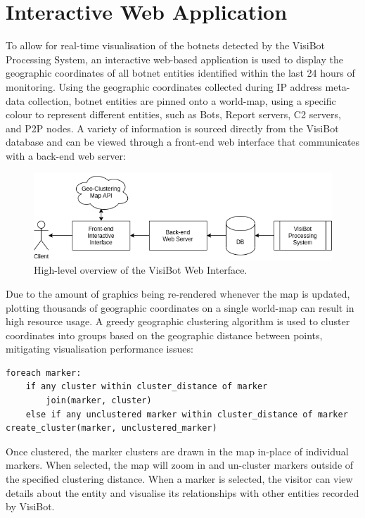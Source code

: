 \section{Interactive Web Application}

To allow for real-time visualisation of the botnets detected by the VisiBot Processing System, an interactive web-based application is used to display the geographic coordinates of all botnet entities identified within the last 24 hours of monitoring. Using the geographic coordinates collected during IP address meta-data collection, botnet entities are pinned onto a world-map, using a specific colour to represent different entities, such as Bots, Report servers, C2 servers, and P2P nodes. A variety of information is sourced directly from the VisiBot database and can be viewed through a front-end web interface that communicates with a back-end web server:

\begin{figure}[!htb]
    \centering
    \includegraphics[width=0.6\linewidth]{flowcharts/design_overview_webapp.png}
    \caption{High-level overview of the VisiBot Web Interface.}
    \label{fig:webapp_design_overview} 
\end{figure}

Due to the amount of graphics being re-rendered whenever the map is updated, plotting thousands of geographic coordinates on a single world-map can result in high resource usage. A greedy geographic clustering algorithm is used to cluster coordinates into groups based on the geographic distance between points, mitigating visualisation performance issues:

\begin{lstlisting}[caption={Pseudocode for Greedy clustering algorithm based on an example by \citet{MarkerClustering}}]
foreach marker:
    if any cluster within cluster_distance of marker
        join(marker, cluster)
    else if any unclustered marker within cluster_distance of marker          create_cluster(marker, unclustered_marker)
\end{lstlisting}

Once clustered, the marker clusters are drawn in the map in-place of individual markers. When selected, the map will zoom in and un-cluster markers outside of the specified clustering distance. When a marker is selected, the visitor can view details about the entity and visualise its relationships with other entities recorded by VisiBot.



